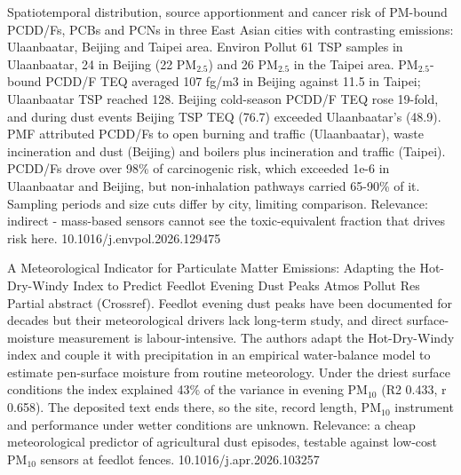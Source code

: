 \documentclass[10pt]{article}
\begin{document}
{Spatiotemporal distribution, source apportionment and cancer risk of PM-bound PCDD/Fs, PCBs and PCNs in three East Asian cities with contrasting emissions: Ulaanbaatar, Beijing and Taipei area.}
{Environ Pollut}
{61 TSP samples in Ulaanbaatar, 24 in Beijing (22 PM$_{2.5}$) and 26 PM$_{2.5}$ in the Taipei area. PM$_{2.5}$-bound PCDD/F TEQ averaged 107 fg/m3 in Beijing against 11.5 in Taipei; Ulaanbaatar TSP reached 128. Beijing cold-season PCDD/F TEQ rose 19-fold, and during dust events Beijing TSP TEQ (76.7) exceeded Ulaanbaatar's (48.9). PMF attributed PCDD/Fs to open burning and traffic (Ulaanbaatar), waste incineration and dust (Beijing) and boilers plus incineration and traffic (Taipei). PCDD/Fs drove over 98\% of carcinogenic risk, which exceeded 1e-6 in Ulaanbaatar and Beijing, but non-inhalation pathways carried 65-90\% of it. Sampling periods and size cuts differ by city, limiting comparison. Relevance: indirect - mass-based sensors cannot see the toxic-equivalent fraction that drives risk here.}
{10.1016/j.envpol.2026.129475}

{A Meteorological Indicator for Particulate Matter Emissions: Adapting the Hot-Dry-Windy Index to Predict Feedlot Evening Dust Peaks}
{Atmos Pollut Res}
{Partial abstract (Crossref). Feedlot evening dust peaks have been documented for decades but their meteorological drivers lack long-term study, and direct surface-moisture measurement is labour-intensive. The authors adapt the Hot-Dry-Windy index and couple it with precipitation in an empirical water-balance model to estimate pen-surface moisture from routine meteorology. Under the driest surface conditions the index explained 43\% of the variance in evening PM$_{10}$ (R2 0.433, r 0.658). The deposited text ends there, so the site, record length, PM$_{10}$ instrument and performance under wetter conditions are unknown. Relevance: a cheap meteorological predictor of agricultural dust episodes, testable against low-cost PM$_{10}$ sensors at feedlot fences.}
{10.1016/j.apr.2026.103257}
\end{document}
